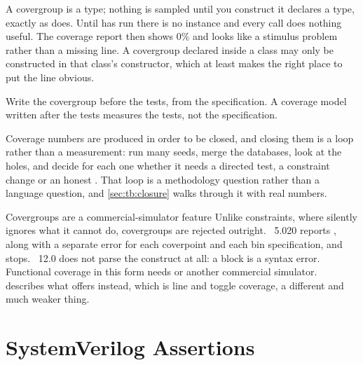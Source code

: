\begin{gotcha}{A covergroup is a type; nothing is sampled until you construct it}
 declares a type, exactly as
 does. Until  has run there is no instance and
every  call does nothing useful. The coverage report then shows
0\% and looks like a stimulus problem rather than a missing line. A covergroup
declared inside a class may only be constructed in that class's constructor,
which at least makes the right place to put the line obvious.
\end{gotcha}

\begin{ruleofthumb}
Write the covergroup before the tests, from the specification. A coverage
model written after the tests measures the tests, not the specification.
\end{ruleofthumb}

Coverage numbers are produced in order to be closed, and closing them is a
loop rather than a measurement: run many seeds, merge the databases, look at
the holes, and decide for each one whether it needs a directed test, a
constraint change or an honest . That loop is a methodology
question rather than a language question, and \cref{sec:tb:closure} walks
through it with real numbers.

\begin{notebox}{Covergroups are a commercial-simulator feature}
Unlike constraints, where  silently ignores what it cannot
do, covergroups are rejected outright. ~5.020 reports
, along with a separate error for each
coverpoint and each bin specification, and stops. ~12.0 does not parse the construct at all: a  block
is a syntax error. Functional coverage in this form needs
 or another commercial simulator.
 describes what  offers instead, which
is line and toggle coverage, a different and much weaker thing.
\end{notebox}

\section{SystemVerilog Assertions}
\label{sec:beyond:sva}
\label{sec:toolkit:sva}

